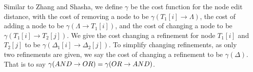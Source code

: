 \begin{definition}\label{def:cost-function}
Similar to Zhang and Shasha, we define $\gamma$ be the cost function for the node edit distance, with the cost of removing a node to be $\gamma(T_1[i] \rightarrow {\Lambda})$, the cost of adding a node to be $\gamma({\Lambda}\rightarrow T_1[i])$, and the cost of changing a node to be $\gamma(T_1[i] \rightarrow T_2[j])$. We give the cost changing a refinement for node  $T_1[i]$ and $T_2[j]$ to be $\gamma(\Delta_1[i] \rightarrow \Delta_2[j])$. To simplify changing refinements, as only two refinements are given, we say the cost of changing a refinement to be $\gamma(\Delta)$. That is to say $\gamma(AND \rightarrow OR) = \gamma(OR \rightarrow AND)$.

\end{definition}



